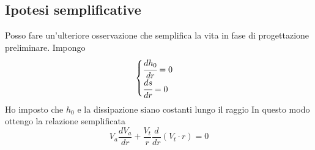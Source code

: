 \subsection{Ipotesi semplificative}
Posso fare un'ulteriore osservazione che semplifica la vita in fase di progettazione preliminare. Impongo
\begin{equation}
\begin{cases}
\cfrac{dh_0}{dr} = 0\\
\cfrac{ds}{dr} = 0
\end{cases}
\end{equation}
Ho imposto che $h_0$ e la dissipazione siano costanti lungo il raggio
In questo modo ottengo la relazione semplificata
\begin{equation}
\boxed{ V_a \frac{d V_a}{dr} + \frac{V_t}{r} \frac{d}{dr}(V_t \cdot r) = 0}
\label{eq:EquilibrioRadSemp}
\end{equation}
